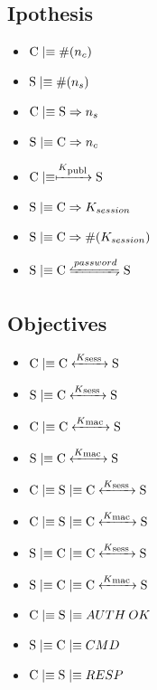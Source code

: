 \subsection{Ipothesis}
\begin{itemize}
\item \(\textnormal{C} \mid\equiv \#(n_c)\)
\item \(\textnormal{S} \mid\equiv \#(n_s)\)
\item \(\textnormal{C} \mid\equiv \textnormal{S} \Rightarrow n_s\)
\item \(\textnormal{S} \mid\equiv \textnormal{C} \Rightarrow n_c\)
\item \(\textnormal{C} \mid\equiv \xmapsto{K\textsubscript{publ}} \textnormal{S}\)
\item \(\textnormal{S} \mid\equiv \textnormal{C} \Rightarrow K_{session}\)
\item \(\textnormal{S} \mid\equiv \textnormal{C} \Rightarrow \#(K_{session})\)
\item \(\textnormal{S} \believes \textnormal{C} \secret{password} \textnormal{S}\)
\end{itemize}

\subsection{Objectives}
\begin{itemize}
\item \(\textnormal{C} \mid\equiv \textnormal{C} \xleftrightarrow{K\textsubscript{sess }} \textnormal{S}\)
\item \(\textnormal{S} \mid\equiv \textnormal{C} \xleftrightarrow{K\textsubscript{sess }} \textnormal{S}\)
\item \(\textnormal{C} \mid\equiv \textnormal{C} \xleftrightarrow{K\textsubscript{mac }} \textnormal{S}\)
\item \(\textnormal{S} \mid\equiv \textnormal{C} \xleftrightarrow{K\textsubscript{mac }} \textnormal{S}\)
\item \(\textnormal{C} \mid\equiv \textnormal{S} \mid\equiv \textnormal{C} \xleftrightarrow{K\textsubscript{sess }} \textnormal{S}\)
\item \(\textnormal{C} \mid\equiv \textnormal{S} \mid\equiv \textnormal{C} \xleftrightarrow{K\textsubscript{mac }} \textnormal{S}\)
\item \(\textnormal{S} \mid\equiv \textnormal{C} \mid\equiv \textnormal{C} \xleftrightarrow{K\textsubscript{sess }} \textnormal{S}\)
\item \(\textnormal{S} \mid\equiv \textnormal{C} \mid\equiv \textnormal{C} \xleftrightarrow{K\textsubscript{mac }} \textnormal{S}\)
\item \(\textnormal{C} \mid\equiv \textnormal{S}\mid\equiv AUTH\:OK\)
\item \(\textnormal{S} \mid\equiv \textnormal{C}\mid\equiv CMD\)
\item \(\textnormal{C} \mid\equiv \textnormal{S}\mid\equiv RESP\)
\end{itemize}

